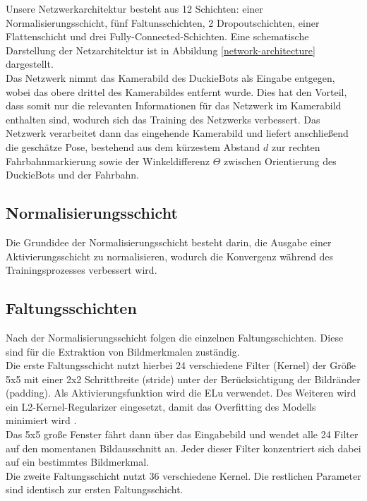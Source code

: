 Unsere Netzwerkarchitektur besteht aus 12 Schichten: einer Normalisierungsschicht, fünf Faltunsschichten, 2 Dropoutschichten, einer Flattenschicht und drei Fully-Connected-Schichten.
Eine schematische Darstellung der Netzarchitektur ist in Abbildung \ref{network-architecture} dargestellt. \\

Das Netzwerk nimmt das  Kamerabild des DuckieBots als Eingabe entgegen, wobei das obere drittel des Kamerabildes entfernt wurde. Dies hat den Vorteil, dass somit nur die relevanten Informationen für das Netzwerk im Kamerabild enthalten sind, wodurch sich das Training des Netzwerks verbessert. Das Netzwerk verarbeitet dann das eingehende Kamerabild und liefert anschließend die geschätze Pose, bestehend aus dem kürzestem Abstand $d$ zur rechten Fahrbahnmarkierung sowie der Winkeldifferenz $\Theta$ zwischen Orientierung des DuckieBots und der Fahrbahn. \\ 

\subsection{Normalisierungsschicht}
Die Grundidee der Normalisierungsschicht besteht darin, die Ausgabe einer Aktivierungsschicht zu normalisieren, wodurch die Konvergenz während des Trainingsprozesses verbessert wird. \cite{tensorflow} \\

\subsection{Faltungsschichten}
Nach der Normalisierungsschicht folgen die einzelnen Faltungsschichten. Diese sind für die Extraktion von Bildmerkmalen zuständig. \\

Die erste Faltungsschicht nutzt hierbei 24 verschiedene Filter (Kernel) der Größe 5x5 mit einer 2x2 Schrittbreite (stride) unter der Berücksichtigung der Bildränder (padding). Als Aktivierungsfunktion wird die ELu verwendet. Des Weiteren wird ein L2-Kernel-Regularizer eingesetzt, damit das Overfitting des Modells minimiert wird \cite{tensorflow2}.  \\ 
Das 5x5 große Fenster fährt dann über das Eingabebild und wendet alle 24 Filter auf den momentanen Bildausschnitt an. Jeder dieser Filter konzentriert sich dabei auf ein bestimmtes Bildmerkmal. \\

Die zweite Faltungsschicht nutzt 36 verschiedene Kernel. Die restlichen Parameter sind identisch zur ersten Faltungsschicht. \\

